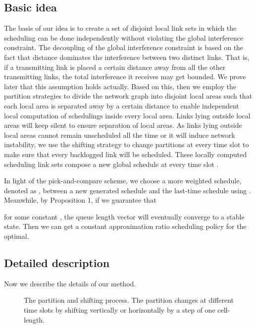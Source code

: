 \documentclass[journal]{IEEEtran}
\begin{document}
\subsection{Basic idea}
The basis of our idea is to create a set of disjoint local link sets in which the scheduling can be done independently without violating the global interference constraint. The decoupling of the global interference constraint is based on the fact that distance dominates the interference between two distinct links. That is, if a transmitting link is placed a certain distance away from all the other transmitting links, the total interference it receives may get bounded. We prove later that this assumption holds actually.
Based on this, then we employ the partition strategies to divide the network graph into disjoint local areas such that each local area is separated away by a certain distance to enable independent local computation of schedulings inside every
local area. Links lying outside local areas will keep silent to ensure
separation of local areas. As links lying outside local areas cannot remain
unscheduled all the time or it will induce network instability, we use the
shifting strategy to change partitions at every time slot to make sure that every
backlogged link will be scheduled. These locally computed scheduling link sets
compose a new global schedule  at every time slot .

In light of the pick-and-compare scheme, we choose a more weighted schedule, denoted as ,
between a new generated schedule  and the last-time schedule
 using . Meanwhile, by Proposition 1, if we guarantee
that

for some constant , the queue length vector 
will eventually converge to a stable state. Then we can get a constant approximation ratio scheduling policy for the optimal.
\vspace*{-0.5\baselineskip}

\subsection{Detailed description}
Now we describe the details of our method.
\setlength{\textfloatsep}{3pt plus 1pt minus 1pt}
\begin{figure}
\centering
{}
\hfill
\centering
{}

\caption{The partition and shifting process. The partition changes at different time slots by shifting vertically or horizontally by a step of one cell-length. }
\end{figure}
\end{document}
